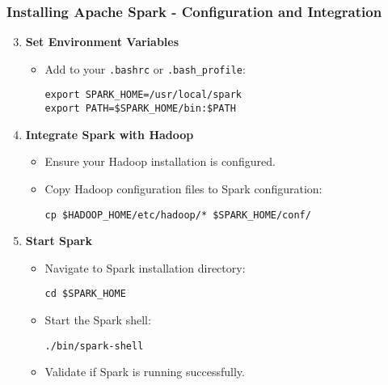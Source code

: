 \documentclass{beamer}
\begin{document}
\begin{frame}[fragile]
    \frametitle{Installing Apache Spark - Configuration and Integration}
    \begin{enumerate}
        \setcounter{enumi}{2}
        \item \textbf{Set Environment Variables}
        \begin{itemize}
            \item Add to your \texttt{.bashrc} or \texttt{.bash\_profile}:
            \begin{lstlisting}
export SPARK_HOME=/usr/local/spark
export PATH=$SPARK_HOME/bin:$PATH
            \end{lstlisting}
        \end{itemize}

        \item \textbf{Integrate Spark with Hadoop}
        \begin{itemize}
            \item Ensure your Hadoop installation is configured.
            \item Copy Hadoop configuration files to Spark configuration:
            \begin{lstlisting}
cp $HADOOP_HOME/etc/hadoop/* $SPARK_HOME/conf/
            \end{lstlisting}
        \end{itemize}

        \item \textbf{Start Spark}
        \begin{itemize}
            \item Navigate to Spark installation directory:
            \begin{lstlisting}
cd $SPARK_HOME
            \end{lstlisting}
            \item Start the Spark shell:
            \begin{lstlisting}
./bin/spark-shell
            \end{lstlisting}
            \item Validate if Spark is running successfully.
        \end{itemize}
    \end{enumerate}
\end{frame}
\end{document}
